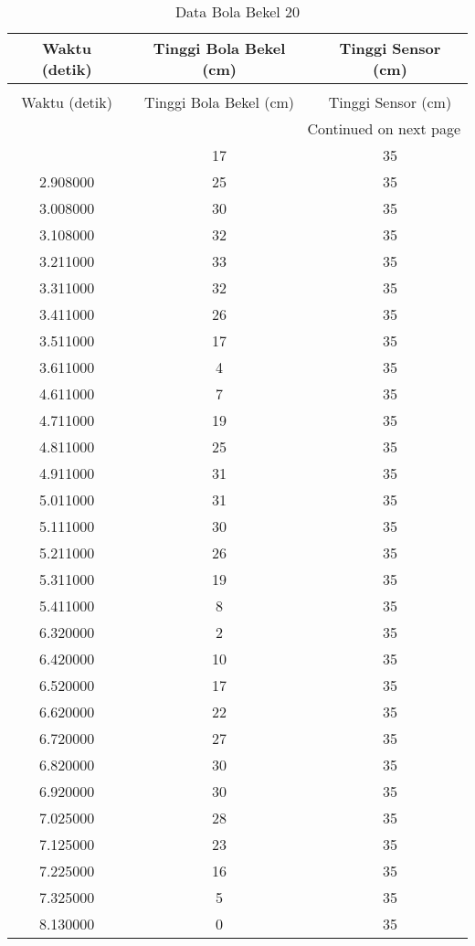 \begin{longtable}[htbp]{|c|c|c|}
\caption{Data Bola Bekel 20} \\
\hline
Waktu (detik) & Tinggi Bola Bekel (cm) & Tinggi Sensor (cm) \\ \hline
\endfirsthead
\caption[]{Data Bola Bekel 20} \\
\hline
Waktu (detik) & Tinggi Bola Bekel (cm) & Tinggi Sensor (cm) \\ \hline
\endhead
\multicolumn{3}{r}{Continued on next page} \\
\endfoot
\endlastfoot
2.808000 & 17 & 35 \\ \hline
2.908000 & 25 & 35 \\ \hline
3.008000 & 30 & 35 \\ \hline
3.108000 & 32 & 35 \\ \hline
3.211000 & 33 & 35 \\ \hline
3.311000 & 32 & 35 \\ \hline
3.411000 & 26 & 35 \\ \hline
3.511000 & 17 & 35 \\ \hline
3.611000 & 4 & 35 \\ \hline
4.611000 & 7 & 35 \\ \hline
4.711000 & 19 & 35 \\ \hline
4.811000 & 25 & 35 \\ \hline
4.911000 & 31 & 35 \\ \hline
5.011000 & 31 & 35 \\ \hline
5.111000 & 30 & 35 \\ \hline
5.211000 & 26 & 35 \\ \hline
5.311000 & 19 & 35 \\ \hline
5.411000 & 8 & 35 \\ \hline
6.320000 & 2 & 35 \\ \hline
6.420000 & 10 & 35 \\ \hline
6.520000 & 17 & 35 \\ \hline
6.620000 & 22 & 35 \\ \hline
6.720000 & 27 & 35 \\ \hline
6.820000 & 30 & 35 \\ \hline
6.920000 & 30 & 35 \\ \hline
7.025000 & 28 & 35 \\ \hline
7.125000 & 23 & 35 \\ \hline
7.225000 & 16 & 35 \\ \hline
7.325000 & 5 & 35 \\ \hline
8.130000 & 0 & 35 \\ \hline

\end{longtable}

